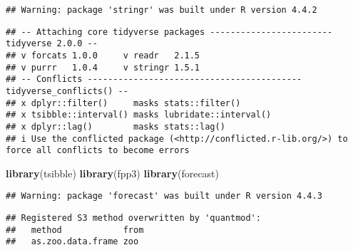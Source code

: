 \documentclass[
]{article}
\newenvironment{Shaded}{\begin{snugshade}}{\end{snugshade}}
\newcommand{\FunctionTok}[1]{\textcolor[rgb]{0.13,0.29,0.53}{\textbf{#1}}}
\newcommand{\NormalTok}[1]{#1}
\begin{document}
\begin{verbatim}
## Warning: package 'stringr' was built under R version 4.4.2
\end{verbatim}

\begin{verbatim}
## -- Attaching core tidyverse packages ------------------------ tidyverse 2.0.0 --
## v forcats 1.0.0     v readr   2.1.5
## v purrr   1.0.4     v stringr 1.5.1
## -- Conflicts ------------------------------------------ tidyverse_conflicts() --
## x dplyr::filter()     masks stats::filter()
## x tsibble::interval() masks lubridate::interval()
## x dplyr::lag()        masks stats::lag()
## i Use the conflicted package (<http://conflicted.r-lib.org/>) to force all conflicts to become errors
\end{verbatim}

\begin{Shaded}
\begin{Highlighting}[]
\FunctionTok{library}\NormalTok{(tsibble)}
\FunctionTok{library}\NormalTok{(fpp3)}
\FunctionTok{library}\NormalTok{(forecast)}
\end{Highlighting}
\end{Shaded}

\begin{verbatim}
## Warning: package 'forecast' was built under R version 4.4.3
\end{verbatim}

\begin{verbatim}
## Registered S3 method overwritten by 'quantmod':
##   method            from
##   as.zoo.data.frame zoo
\end{verbatim}
\end{document}
